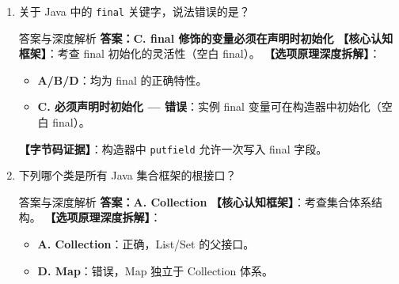 ﻿\documentclass[12pt, a4paper]{ctexart}
\newcommand{\code}[1]{\texttt{#1}}
\begin{document}
\begin{enumerate}[label=\arabic*., itemsep=1.5em]
	\item 关于 Java 中的 \code{final} 关键字，说法错误的是？
	      \begin{bluebox}{答案与深度解析}
		      \textbf{答案：C. final 修饰的变量必须在声明时初始化}
		      \textbf{【核心认知框架】}：考查 final 初始化的灵活性（空白 final）。
		      \textbf{【选项原理深度拆解】}：
		      \begin{itemize}[leftmargin=*, nosep]
			      \item \textbf{A/B/D}：均为 final 的正确特性。
			      \item \textbf{C. 必须声明时初始化 — 错误}：实例 final 变量可在构造器中初始化（空白 final）。
		      \end{itemize}
		      \textbf{【字节码证据】}：构造器中 \code{putfield} 允许一次写入 final 字段。
	      \end{bluebox}

	\item 下列哪个类是所有 Java 集合框架的根接口？
	      \begin{bluebox}{答案与深度解析}
		      \textbf{答案：A. Collection}
		      \textbf{【核心认知框架】}：考查集合体系结构。
		      \textbf{【选项原理深度拆解】}：
		      \begin{itemize}[leftmargin=*, nosep]
			      \item \textbf{A. Collection}：正确，List/Set 的父接口。
			      \item \textbf{D. Map}：错误，Map 独立于 Collection 体系。
		      \end{itemize}
	      \end{bluebox}


\end{enumerate}
\end{document}

